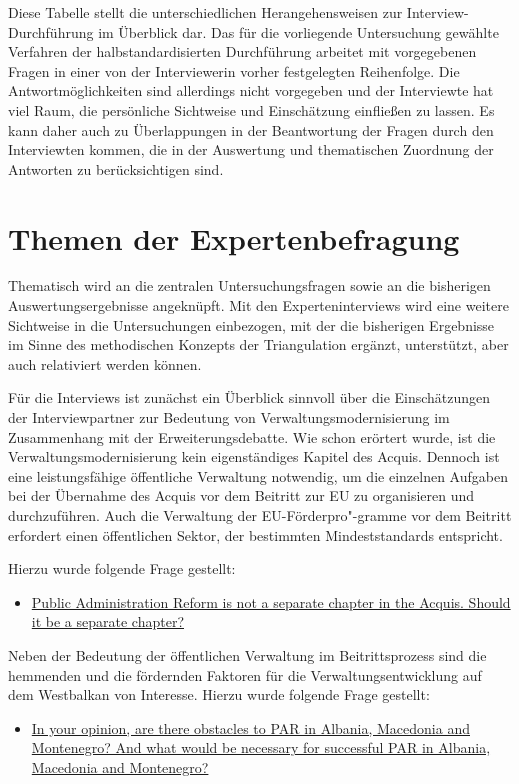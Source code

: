 Diese Tabelle stellt die unterschiedlichen Herangehensweisen zur Interview-Durchführung im Überblick dar. Das für die vorliegende Untersuchung gewählte Verfahren der halbstandardisierten Durchführung arbeitet mit vorgegebenen Fragen in einer von der Interviewerin vorher festgelegten Reihenfolge. Die Antwortmöglichkeiten sind allerdings nicht vorgegeben und der Interviewte hat viel Raum, die persönliche Sichtweise und Einschätzung einfließen zu lassen. Es kann daher auch zu Überlappungen in der Beantwortung der Fragen durch den Interviewten kommen, die in der Auswertung und thematischen Zuordnung der Antworten zu berücksichtigen sind.
\section{Themen der Expertenbefragung} 
Thematisch wird an die zentralen Untersuchungsfragen sowie an die bisherigen Auswertungsergebnisse angeknüpft. Mit den Experteninterviews wird eine weitere Sichtweise in die Untersuchungen einbezogen, mit der die bisherigen Ergebnisse im Sinne des methodischen Konzepts der Triangulation ergänzt, unterstützt, aber auch relativiert werden können.\par
Für die Interviews ist zunächst ein Überblick sinnvoll über die Einschätzungen der Interviewpartner zur Bedeutung von Verwaltungsmodernisierung im Zusammenhang mit der Erweiterungsdebatte. Wie schon erörtert wurde, ist die Verwaltungsmodernisierung kein eigenständiges Kapitel des Acquis. Dennoch ist eine leistungsfähige öffentliche Verwaltung notwendig, um die einzelnen Aufgaben bei der Übernahme des Acquis vor dem Beitritt zur EU zu organisieren und durchzuführen. Auch die Verwaltung der EU-Förderpro"-gramme vor dem Beitritt erfordert einen öffentlichen Sektor, der bestimmten Mindeststandards entspricht.\par
Hierzu wurde folgende Frage gestellt:\par
\begin{itemize}[label={}]
\item \ul{Public Administration Reform is not a separate chapter in the Acquis. Should it be a separate chapter?}
\end{itemize}
Neben der Bedeutung der öffentlichen Verwaltung im Beitrittsprozess sind die hemmenden und die fördernden Faktoren für die Verwaltungsentwicklung auf dem Westbalkan von Interesse. Hierzu wurde folgende Frage gestellt:
\begin{itemize}[label={}]
\item \ul{In your opinion, are there obstacles to PAR in Albania, Macedonia and Montenegro? And what would be necessary for successful PAR in Albania, Macedonia and Montenegro?}
\end{itemize}
